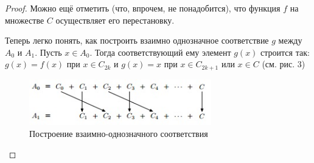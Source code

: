 \documentclass[a4paper, 12pt]{article}
\begin{document}
\begin{proof}
Можно ещё отметить (что, впрочем, не понадобится), что функция $f$ на множестве $C$ осуществляет его перестановку.

Теперь легко понять, как построить взаимно однозначное соответствие $g$ между $A_0$ и $A_1$. Пусть $x \in A_0$. Тогда соответствующий ему элемент $g(x)$ строится так: $g(x) = f(x)$ при $x \in C_{2k}$ и $g(x) = x$ при $x \in C_{2k + 1}$ или $x \in C$ (см. рис. 3)

\begin{figure}[h]
\begin{center}
\begin{minipage}[h]{0.4\linewidth}
 \includegraphics[height=2cm, width=\linewidth]{images/kantorbern3.jpg}
 \caption{Построение взаимно-однозначного соответствия}
 \end{minipage}
 \end{center}
 \end{figure}

\end{proof}
    
\end{document}
